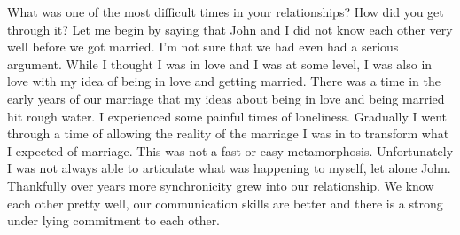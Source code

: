 What was one of the most difficult times in your relationships? How did you get through it?
Let me begin by saying that John and I did not know each other very well before we got married. I'm not sure that we had even had a serious argument. While I thought I was in love and I was at some level, I was also in love with my idea of being in love and getting married. There was a time in the early years of our marriage that my ideas about being in love and being married hit rough water. I experienced some painful times of loneliness. Gradually I went through a time of allowing the reality of the marriage I was in to transform what I expected of marriage. This was not a fast or easy metamorphosis.  Unfortunately I was not always able to articulate what was happening to myself, let alone John. Thankfully over years more synchronicity grew into our relationship. We know each other pretty well, our communication skills are better and there is a strong under lying commitment to each other.




